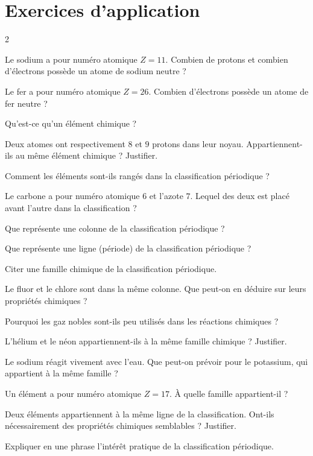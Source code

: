 \section{Exercices d'application}
\begin{multicols}{2}

\exo{} Le sodium a pour numéro atomique $Z=11$. Combien de protons et combien
d'électrons possède un atome de sodium neutre ?

\exo{} Le fer a pour numéro atomique $Z=26$. Combien d'électrons possède un atome
de fer neutre ?

\exo{} Qu'est-ce qu'un élément chimique ?

\exo{} Deux atomes ont respectivement $8$ et $9$ protons dans leur noyau.
Appartiennent-ils au même élément chimique ? Justifier.

\exo{} Comment les éléments sont-ils rangés dans la classification périodique ?

\exo{} Le carbone a pour numéro atomique $6$ et l'azote $7$. Lequel des deux est
placé avant l'autre dans la classification ?

\exo{} Que représente une colonne de la classification périodique ?

\exo{} Que représente une ligne (période) de la classification périodique ?

\exo{} Citer une famille chimique de la classification périodique.

\exo{} Le fluor et le chlore sont dans la même colonne. Que peut-on en déduire sur
leurs propriétés chimiques ?

\exo{} Pourquoi les gaz nobles sont-ils peu utilisés dans les réactions
chimiques ?

\exo{} L'hélium et le néon appartiennent-ils à la même famille chimique ?
Justifier.

\exo{} Le sodium réagit vivement avec l'eau. Que peut-on prévoir pour le
potassium, qui appartient à la même famille ?

\exo{} Un élément a pour numéro atomique $Z=17$. À quelle famille appartient-il ?

\exo{} Deux éléments appartiennent à la même ligne de la classification. Ont-ils
nécessairement des propriétés chimiques semblables ? Justifier.

\exo{} Expliquer en une phrase l'intérêt pratique de la classification
périodique.

\end{multicols}

